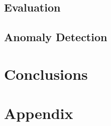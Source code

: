 \documentclass[12pt]{article}
\begin{document}
\subsection{Evaluation}
	\label{sec:expeval}
	
\newpage
\subsection{Anomaly Detection}
	\label{sec:expanal}
	

\newpage
\section{Conclusions}
	\label{sec:concl}
	


\newpage



\newpage
\appendix
\section{Appendix}



\newpage
{}
\end{document}

